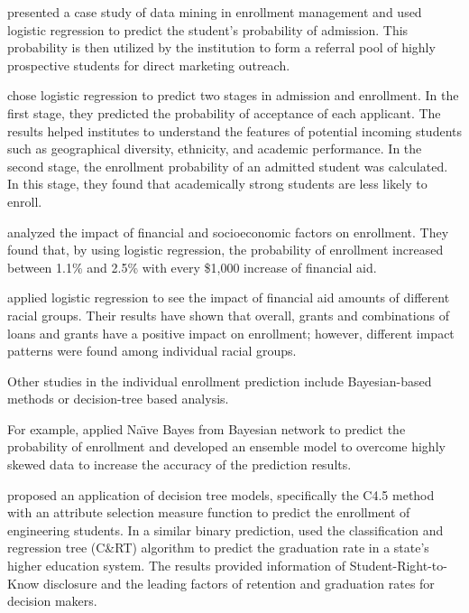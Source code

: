 \documentclass[12pt,english]{report}
\begin{document}
\citet{lr_1_chang} presented a case study of data mining in enrollment management and used logistic regression to predict the 
student's probability of admission. This probability is then utilized by the institution to form a referral pool of highly prospective students for direct marketing outreach.

\citet{lr_2} chose logistic regression to predict two stages in admission and enrollment. In the first stage, they predicted the probability of acceptance of each applicant. The results helped institutes to understand the features of potential incoming students such as geographical diversity, ethnicity, and academic  performance. In the second stage, the enrollment probability of an admitted  student was calculated. In this stage, they found that academically strong students are less likely to enroll.

\citet{Braunstein1999} analyzed the impact of financial and socioeconomic factors on  enrollment. They found that, by using logistic regression, the probability of enrollment increased between 1.1\% and  2.5\% with every \$1,000 increase of financial 
aid.

\citet{lr_aid2} applied logistic regression to see the impact of financial aid amounts  of different racial groups. Their results have shown that overall, grants and  combinations of loans and grants have a positive impact on enrollment;  however, different impact patterns were  found among individual racial groups.



Other studies in the individual enrollment prediction include Bayesian-based methods or decision-tree based analysis.  

For example, \citet{Thanh2007} applied Na{\"\i}ve Bayes  from Bayesian network to predict the probability of enrollment and developed  an ensemble model to overcome highly skewed data to increase the accuracy of  the prediction results. 

\citet{dt_enroll_india} proposed an application of decision tree models, specifically the C4.5 method with an attribute selection measure function to predict the enrollment of engineering students. %
In a similar binary prediction, \citet{Bailey2006} used the classification and regression tree (C\&RT) algorithm to predict the 
graduation rate in a state's higher education system. The results provided information of Student-Right-to-Know disclosure and  
the leading factors of retention and graduation rates for decision makers.
\end{document}
